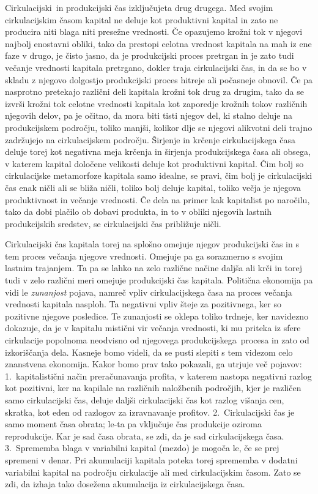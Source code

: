 \documentclass[kapital_02.tex]{subfiles}
\begin{document}
Cirkulacijski\KPEstran\ in produkcijski čas izključujeta drug drugega.
Med svojim cirkulacijskim časom kapital ne deluje kot produktivni kapital in zato ne producira niti blaga niti presežne vrednosti.
Če opazujemo krožni tok v njegovi najbolj enostavni obliki, tako da prestopi celotna vrednost kapitala na mah iz ene faze v drugo, je čisto jasno, da je produkcijski proces pretrgan in je zato tudi večanje vrednosti kapitala pretrgano, dokler traja cirkulacijski čas, in da se bo v skladu z njegovo dolgostjo produkcijski proces hitreje ali počasneje obnovil.
Če pa nasprotno pretekajo različni deli kapitala krožni tok drug za drugim, tako da se izvrši krožni tok celotne vrednosti kapitala kot zaporedje krožnih tokov različnih njegovih delov, pa je očitno, da mora biti tisti njegov del, ki stalno deluje na produkcijskem področju, toliko manjši, kolikor dlje se njegovi alikvotni deli trajno zadržujejo na cirkulacijskem področju.
Širjenje in krčenje cirkulacijskega časa deluje torej kot negativna meja krčenja in širjenja produkcijskega časa ali obsega, v katerem kapital določene velikosti deluje kot produktivni kapital.
Čim bolj so cirkulacijske metamorfoze kapitala samo idealne, se pravi, čim bolj je cirkulacijski čas enak ničli ali se bliža ničli, toliko bolj deluje kapital, toliko večja je njegova produktivnost in večanje vrednosti.
Če dela na primer kak kapitalist po naročilu, tako da dobi plačilo ob dobavi produkta, in to v obliki njegovih lastnih produkcijskih sredstev, se cirkulacijski čas približuje ničli.

Cirkulacijski čas kapitala torej na splošno omejuje njegov produkcijski čas in s tem proces večanja njegove vrednosti.
Omejuje pa ga sorazmerno s svojim lastnim trajanjem.
Ta pa se lahko na zelo različne načine daljša ali krči in torej tudi v zelo različni meri omejuje produkcijski čas kapitala.
Politična ekonomija pa vidi le \emph{zunanjost} pojava, namreč vpliv cirkulacijskega časa na proces večanja vrednosti kapitala nasploh.
Ta negativni vpliv šteje za pozitivnega, ker so pozitivne njegove posledice.
Te zunanjosti se oklepa toliko trdneje, ker navidezno dokazuje, da je v kapitalu mistični vir večanja vrednosti, ki mu priteka iz sfere cirkulacije popolnoma neodvisno od njegovega produkcijskega\KPEstran\ procesa in zato od izkoriščanja dela.
Kasneje bomo videli, da se pusti slepiti s tem videzom celo znanstvena ekonomija.
Kakor bomo prav tako pokazali, ga utrjuje več pojavov: 1.\ kapitalistični način preračunavanja profita, v katerem nastopa negativni razlog kot pozitivni, ker na kapilale na različnih naložbenih področjih, kjer je različen samo cirkulacijski čas, deluje daljši cirkulacijski čas kot razlog višanja cen, skratka, kot eden od razlogov za izravnavanje profitov.
2.\ Cirkulacijski čas je samo moment časa obrata; le-ta pa vključuje čas produkcije oziroma reprodukcije.
Kar je sad časa obrata, se zdi, da je sad cirkulacijskega časa.
3.\ Sprememba blaga v variabilni kapital (mezdo) je mogoča le, če se prej spremeni v denar.
Pri akumulaciji kapitala poteka torej sprememba v dodatni variabilni kapital na področju cirkulacije ali med cirkulacijskim časom.
Zato se zdi, da izhaja tako dosežena akumulacija iz cirkulacijskega časa.
\end{document}
